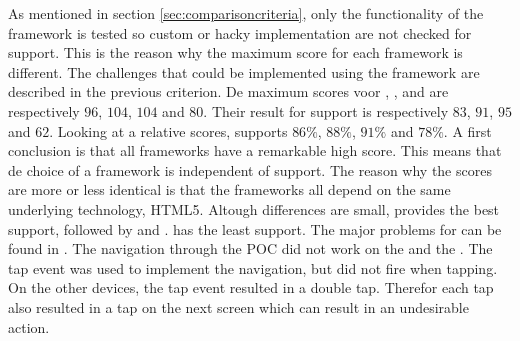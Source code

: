 \documentclass[a4paper]{artikel3}
\begin{document}
\begin{table}
\centering
{}
\caption{Overview of support per challenge.}
\label{tabel:evaluatie-ondersteuning-u}
\end{table}

As mentioned in section \ref{sec:comparisoncriteria},  only the functionality of the framework is tested so custom or hacky implementation are not checked for support.
This is the reason why the maximum score for each framework is different.
The challenges that could be implemented using the framework are described in the previous criterion.
De maximum scores voor \sta{},  \kendob{},  \jqma{} and \lungo{} are respectively $96$, $104$, $104$ and $80$.
Their result for support is respectively $83$, $91$, $95$ and $62$.
Looking at a relative scores,  \st{} supports $86\%$,  \kendo{} $88\%$,  \jqm{} $91\%$ and \lungo $78\%$.
A first conclusion is that all frameworks have a remarkable high score.
This means that de choice of a framework is independent of support.
The reason why the scores are more or less identical is that the frameworks all depend on the same underlying technology,  HTML5.
Altough differences are small,  \jqma{} provides the best support,  followed by \kendob{} and \sta{}.
\lungo{} has the least support.
The major problems for \lungo{} can be found in .
The navigation through the POC did not work on the \htc{} and the \gtab{}. 
The tap event was used to implement the navigation, but did not fire when tapping.
On the other devices, the tap event resulted in a double tap.
Therefor each tap also resulted in a tap on the next screen which can result in an undesirable action.
\end{document}
